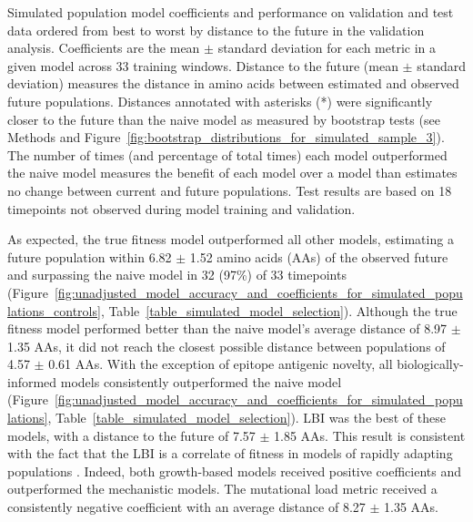\begin{table}
  \begin{center}
    \scalebox{0.9}{
      
    }
    \caption{
      Simulated population model coefficients and performance on validation and test data ordered from best to worst by distance to the future in the validation analysis.
      Coefficients are the mean $\pm$ standard deviation for each metric in a given model across 33 training windows.
      Distance to the future (mean $\pm$ standard deviation) measures the distance in amino acids between estimated and observed future populations.
      Distances annotated with asterisks (*) were significantly closer to the future than the naive model as measured by bootstrap tests (see Methods and Figure~\ref{fig:bootstrap_distributions_for_simulated_sample_3}).
      The number of times (and percentage of total times) each model outperformed the naive model measures the benefit of each model over a model than estimates no change between current and future populations.
      Test results are based on 18 timepoints not observed during model training and validation.
    }
    \label{table_simulated_model_selection}
  \end{center}

\end{table}

As expected, the true fitness model outperformed all other models, estimating a future population within 6.82 $\pm$ 1.52 amino acids (AAs) of the observed future and surpassing the naive model in 32 (97\%) of 33 timepoints (Figure~\ref{fig:unadjusted_model_accuracy_and_coefficients_for_simulated_populations_controls}, Table~\ref{table_simulated_model_selection}).
Although the true fitness model performed better than the naive model's average distance of 8.97 $\pm$ 1.35 AAs, it did not reach the closest possible distance between populations of 4.57 $\pm$ 0.61 AAs.
With the exception of epitope antigenic novelty, all biologically-informed models consistently outperformed the naive model (Figure~\ref{fig:unadjusted_model_accuracy_and_coefficients_for_simulated_populations}, Table~\ref{table_simulated_model_selection}).
LBI was the best of these models, with a distance to the future of 7.57 $\pm$ 1.85 AAs.
This result is consistent with the fact that the LBI is a correlate of fitness in models of rapidly adapting populations \citep{Neher:2014eu}.
Indeed, both growth-based models received positive coefficients and outperformed the mechanistic models.
The mutational load metric received a consistently negative coefficient with an average distance of 8.27 $\pm$ 1.35 AAs.

